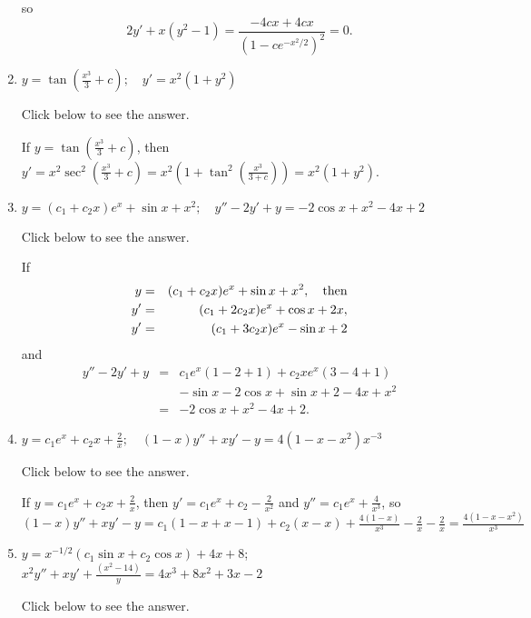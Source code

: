 \documentclass{ximera}
\begin{document}
\begin{problem}
\begin{enumerate}
\begin{expandable}
so
$$
2y'+x(y^2-1)=\frac{-4cx+4cx}{(1-ce^{-x^2/2})^2}=0.
$$
\end{expandable}

\item %
$y=\tan\left(\frac{x^3}{3}+c\right);     \quad
y'=x^2(1+y^2)$

Click below to see the answer.

\begin{expandable}
    If $y=\tan\left( \frac{x^3}{3}+c\right)$, then
$y'=x^2\sec^2\left(\frac{x^3}{3}+c\right)=
x^2\left(1+\tan^2\left(\frac{x^3}{3+c}\right)\right)=
x^2(1+y^2)$.
\end{expandable}

\item %
$y=(c_1+c_2x)e^x+\sin x+x^2;    \quad
y''-2y'+y=-2 \cos x+x^2-4x+2$

Click below to see the answer.

\begin{expandable}
    If
\begin{eqnarray*}
y&=&(c_1+c_2x)e^x+\sin x+x^2,\mbox{\quad then}\\
y'&=&(c_1+2c_2x)e^x+\cos x+2x,\\
y'&=&(c_1+3c_2x)e^x-\sin x+2
\end{eqnarray*}
and
\begin{eqnarray*}
y''-2y'+y&=&c_1e^x(1-2+1)+c_2xe^x(3-4+1)\\
&&-\sin x-2\cos x+\sin x+2-4x+x^2\\
&=&-2 \cos x+x^2-4x+2.
\end{eqnarray*}
\end{expandable}

\item %
$y=c_1e^x+c_2x+\frac{2}{ x};     \quad
(1-x)y''+xy'- y=4(1-x-x^2)x^{-3}$

Click below to see the answer.

\begin{expandable}
    If $y=c_1e^x+c_2x+\frac{2}{x}$, then
$y'=c_1e^x+c_2-\frac{2}{x^2}$ and $y''=c_1e^x+\frac{4}{x^3}$, so
$(1-x)y''+xy'- y=c_1(1-x+x-1)+c_2(x-x)+\frac{4(1-x)}{x^3}-\frac{2}{
x}-\frac{2}{x}= \frac{4(1-x-x^2)}{x^3}$
\end{expandable}

\item %
$y=x^{-1/2}(c_1\sin x+c_2 \cos x)+4x+8$;  
$x^2y''+xy'+\frac{\left(x^2-{1}{4}\right)}y=4x^3+8x^2+3x-2$

Click below to see the answer.


\end{enumerate}
\end{problem}
\end{document}
